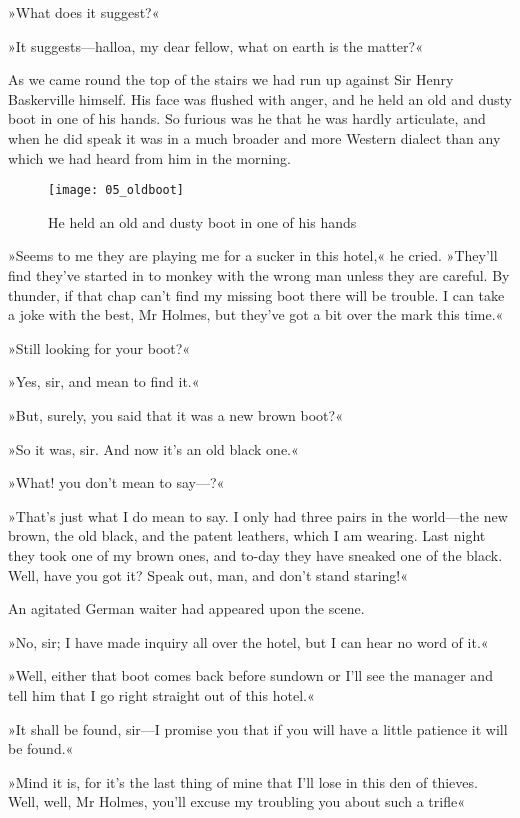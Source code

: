 »What does it suggest?«

»It suggests—halloa, my dear fellow, what on earth is the matter?«

As we came round the top of the stairs we had run up against Sir Henry Baskerville himself. His face was flushed with anger, and he held an old and dusty boot in one of his hands. So furious was he that he was hardly articulate, and when he did speak it was in a much broader and more Western dialect than any which we had heard from him in the morning.

\begin{figure}[p]
\centering
\texttt{[image: 05\_oldboot]}
\caption{He held an old and dusty boot in one of his hands}
\end{figure}

»Seems to me they are playing me for a sucker in this hotel,« he cried. »They'll find they've started in to monkey with the wrong man unless they are careful. By thunder, if that chap can't find my missing boot there will be trouble. I can take a joke with the best, Mr Holmes, but they've got a bit over the mark this time.«

»Still looking for your boot?«

»Yes, sir, and mean to find it.«

»But, surely, you said that it was a new brown boot?«

»So it was, sir. And now it's an old black one.«

»What! you don't mean to say—?«

»That's just what I do mean to say. I only had three pairs in the world—the new brown, the old black, and the patent leathers, which I am wearing. Last night they took one of my brown ones, and to-day they have sneaked one of the black. Well, have you got it? Speak out, man, and don't stand staring!«

An agitated German waiter had appeared upon the scene.

»No, sir; I have made inquiry all over the hotel, but I can hear no word of it.«

»Well, either that boot comes back before sundown or I'll see the manager and tell him that I go right straight out of this hotel.«

»It shall be found, sir—I promise you that if you will have a little patience it will be found.«

»Mind it is, for it's the last thing of mine that I'll lose in this den of thieves. Well, well, Mr Holmes, you'll excuse my troubling you about such a trifle\longdash«

